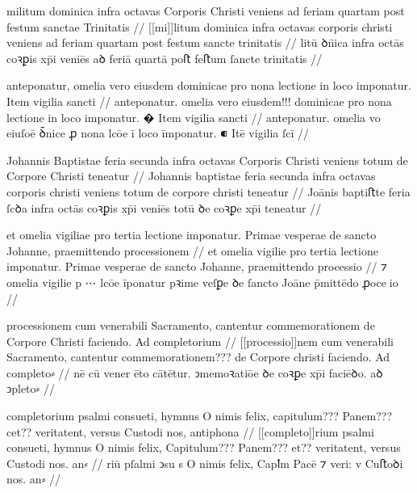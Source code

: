 \ex \bg
\gla
{}
militum dominica infra octavas Corporis 
Christi veniens ad feriam quartam post festum sanctae Trinitatis
//
\glRekonstrukcja
{}
[[mi]]litum dominica infra octavas corporis 
christi veniens ad feriam quartam post festum sancte trinitatis
//
\glU
{}
litū ꝺn̄ica infra octās coꝛꝑis xp̄i veniēs aꝺ feriā quartā poﬅ feﬅum ſancte trinitatis
//
\endgl
\xe


\ex \bg
\gla
{}
anteponatur, omelia vero eiusdem dominicae pro nona lectione in loco imponatur.
{} Item vigilia sancti
//
\glRekonstrukcja
{}
anteponatur. omelia vero eiusdem!!! dominicae pro nona lectione in loco imponatur.
� Item vigilia sancti
//
\glU
{}
anteponatur. omelia vo eiuſoē ꝺ̄nice ꝓ nona lcōe ī loco īmponatur. ⁌ Itē vigilia ſcī
//
\endgl
\xe



\ex \bg
\gla
{}
Johannis Baptistae feria secunda infra octavas
Corporis Christi veniens totum de Corpore Christi teneatur
//
\glRekonstrukcja
{}
Johannis baptistae feria secunda infra octavas
corporis christi veniens totum de corpore christi teneatur
//
\glU
{}
Joānis baptiﬅte feria ſcꝺa infra octās coꝛꝑis xp̄i veniēs totū ꝺe coꝛꝑe xp̄i teneatur
//
\endgl
\xe



\ex \bg
\gla
{}
et omelia
vigiliae pro tertia lectione imponatur. Primae vesperae de sancto Johanne,
praemittendo processionem
//
\glRekonstrukcja
{}
et omelia
vigilie pro tertia lectione imponatur. Primae vesperae de sancto Johanne,
praemittendo processio
//
\glU
{}
⁊ omelia vigilie p ⋯ lcōe īponatur pꝛime veſꝑe ꝺe ſancto Joāne p̄mittēdo ꝓoceio
//
\endgl
\xe



\ex \bg
\gla
{}
processionem cum venerabili Sacramento, cantentur commemorationem de Corpore Christi faciendo. Ad completorium
//
\glRekonstrukcja
{}
[[processio]]nem cum venerabili Sacramento, cantentur commemorationem??? de Corpore christi faciendo. Ad completo⸗
//
\glU
{}
nē cū vener ēto cātētur. ↄmemoꝛatiōe ꝺe coꝛꝑe xp̄i faciēꝺo. aꝺ ↄpleto⸗
//
\endgl
\xe



\ex \bg
\gla
{}
completorium psalmi
consueti, hymnus O nimis felix, capitulum??? Panem??? cet?? veritatent, versus
Custodi nos, antiphona
//
\glRekonstrukcja
{}
[[completo]]rium psalmi
consueti, hymnus O nimis felix, Capitulum??? Panem??? et?? veritatent, versus
Custodi nos. an⸗
//
\glU
{}
riū pſalmi ↄsu s O nimis felix, Capꝉm Pacē ⁊ veri: v Cuﬅoꝺi nos. an⸗
//
\endgl
\xe




